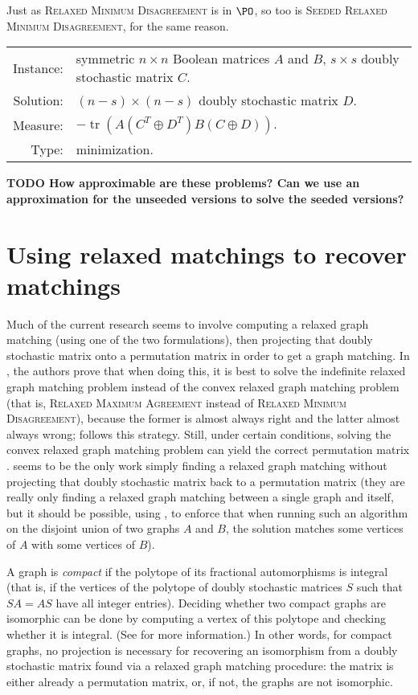 \documentclass{article}
\newcommand{\todo}[1]{\textbf{TODO #1}}
\newcommand{\1}{\mathbf{1}}
\newcommand{\RMD}{\textsc{Relaxed Minimum Disagreement}}
\newcommand{\RMA}{\textsc{Relaxed Maximum Agreement}}
\newcommand{\SRMD}{\textsc{Seeded Relaxed Minimum Disagreement}}
\newcommand{\SRMA}{\textsc{Seeded Relaxed Maximum Agreement}}
\DeclareMathOperator{\tr}{tr}
\begin{document}
Just as \RMD{} is in $\PO$, so too is \SRMD{}, for the same reason.

\begin{definition}[\SRMA{}]
  \mbox{}

  \begin{tabular}{r p{9.3cm}}
    Instance: & symmetric $n \times n$ Boolean matrices $A$ and $B$, $s \times s$ doubly stochastic matrix $C$. \\
    Solution: & $(n - s) \times (n - s)$ doubly stochastic matrix $D$. \\
    Measure: & $-\tr(A (C^T \oplus D^T) B (C \oplus D))$. \\
    Type: & minimization.
  \end{tabular}
\end{definition}

\todo{
  How approximable are these problems?
  Can we use an approximation for the unseeded versions to solve the seeded versions?
}

\section{Using relaxed matchings to recover matchings}

Much of the current research seems to involve computing a relaxed graph matching (using one of the two formulations), then projecting that doubly stochastic matrix onto a permutation matrix in order to get a graph matching.
In \autocite{relax14}, the authors prove that when doing this, it is best to solve the indefinite relaxed graph matching problem instead of the convex relaxed graph matching problem (that is, \RMA{} instead of \RMD{}), because the former is almost always right and the latter almost always wrong; \autocite{v14} follows this strategy.
Still, under certain conditions, solving the convex relaxed graph matching problem can yield the correct permutation matrix \autocite{abk14, fs14}.
\autocite{kmgg14} seems to be the only work simply finding a relaxed graph matching without projecting that doubly stochastic matrix back to a permutation matrix (they are really only finding a relaxed graph matching between a single graph and itself, but it should be possible, using \autocite{gkms14}, to enforce that when running such an algorithm on the disjoint union of two graphs $A$ and $B$, the solution matches some vertices of $A$ with some vertices of $B$).

A graph is \emph{compact} if the polytope of its fractional automorphisms is integral (that is, if the vertices of the polytope of doubly stochastic matrices $S$ such that $SA = AS$ have all integer entries).
Deciding whether two compact graphs are isomorphic can be done by computing a vertex of this polytope and checking whether it is integral.
(See \autocite{akrv15} for more information.)
In other words, for compact graphs, no projection is necessary for recovering an isomorphism from a doubly stochastic matrix found via a relaxed graph matching procedure: the matrix is either already a permutation matrix, or, if not, the graphs are not isomorphic.
\end{document}
